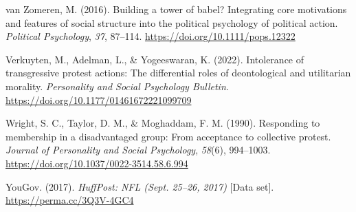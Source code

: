\documentclass[twocolumn, 11pt, letterpaper]{article}
\newenvironment{CSLReferences}[2]{}{}
\begin{document}
\begin{CSLReferences}{1}{0}
\leavevmode{}%
van Zomeren, M. (2016). Building a tower of babel? {Integrating} core
motivations and features of social structure into the political
psychology of political action. \emph{Political Psychology}, \emph{37},
87--114. \url{https://doi.org/10.1111/pops.12322}

\leavevmode{}%
Verkuyten, M., Adelman, L., \& Yogeeswaran, K. (2022). Intolerance of
transgressive protest actions: The differential roles of deontological
and utilitarian morality. \emph{Personality and Social Psychology
Bulletin}. \url{https://doi.org/10.1177/01461672221099709}

\leavevmode{}%
Wright, S. C., Taylor, D. M., \& Moghaddam, F. M. (1990). Responding to
membership in a disadvantaged group: From acceptance to collective
protest. \emph{Journal of Personality and Social Psychology},
\emph{58}(6), 994--1003.
\url{https://doi.org/10.1037/0022-3514.58.6.994}

\leavevmode{}%
YouGov. (2017). \emph{{HuffPost: NFL} {(Sept. 25--26, 2017)}} {[}Data
set{]}. \url{https://perma.cc/3Q3V-4GC4}

\end{CSLReferences}

\endgroup

\newpage

\setcounter{table}{0}
\renewcommand{\thetable}{A\arabic{table}}
\end{document}
